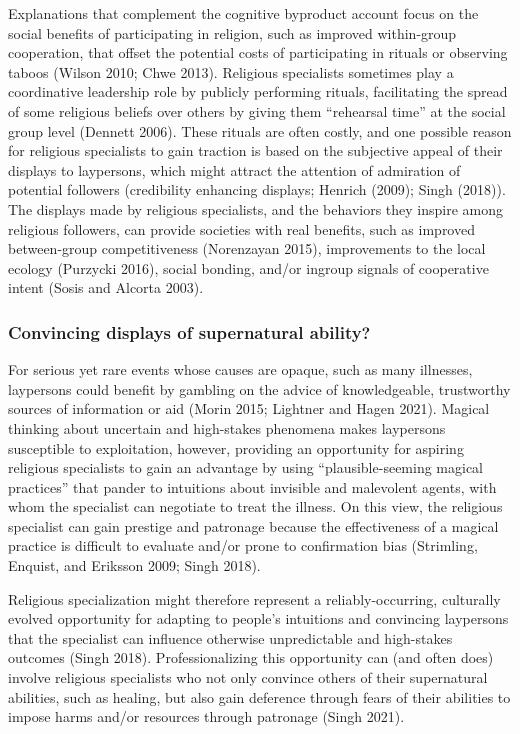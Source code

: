 \documentclass[
  11pt,
]{article}
\begin{document}
Explanations that complement the cognitive byproduct account focus on the social benefits of participating in religion, such as improved within-group cooperation, that offset the potential costs of participating in rituals or observing taboos (Wilson 2010; Chwe 2013). Religious specialists sometimes play a coordinative leadership role by publicly performing rituals, facilitating the spread of some religious beliefs over others by giving them ``rehearsal time'' at the social group level (Dennett 2006). These rituals are often costly, and one possible reason for religious specialists to gain traction is based on the subjective appeal of their displays to laypersons, which might attract the attention of admiration of potential followers (credibility enhancing displays; Henrich (2009); Singh (2018)). The displays made by religious specialists, and the behaviors they inspire among religious followers, can provide societies with real benefits, such as improved between-group competitiveness (Norenzayan 2015), improvements to the local ecology (Purzycki 2016), social bonding, and/or ingroup signals of cooperative intent (Sosis and Alcorta 2003).

\hypertarget{convincing-displays-of-supernatural-ability}{%
\subsubsection{Convincing displays of supernatural ability?}\label{convincing-displays-of-supernatural-ability}}

For serious yet rare events whose causes are opaque, such as many illnesses, laypersons could benefit by gambling on the advice of knowledgeable, trustworthy sources of information or aid (Morin 2015; Lightner and Hagen 2021). Magical thinking about uncertain and high-stakes phenomena makes laypersons susceptible to exploitation, however, providing an opportunity for aspiring religious specialists to gain an advantage by using ``plausible-seeming magical practices'' that pander to intuitions about invisible and malevolent agents, with whom the specialist can negotiate to treat the illness. On this view, the religious specialist can gain prestige and patronage because the effectiveness of a magical practice is difficult to evaluate and/or prone to confirmation bias (Strimling, Enquist, and Eriksson 2009; Singh 2018).

Religious specialization might therefore represent a reliably-occurring, culturally evolved opportunity for adapting to people's intuitions and convincing laypersons that the specialist can influence otherwise unpredictable and high-stakes outcomes (Singh 2018). Professionalizing this opportunity can (and often does) involve religious specialists who not only convince others of their supernatural abilities, such as healing, but also gain deference through fears of their abilities to impose harms and/or resources through patronage (Singh 2021).
\end{document}
